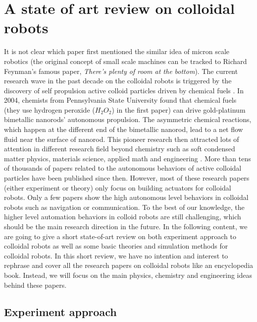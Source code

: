 \section{A state of art review on colloidal robots }
It is not clear which paper first mentioned the similar idea of micron scale robotics (the original concept of  small scale machines can be tracked to Richard Feynman's famous paper, \textit{There's plenty of room at the bottom}\autocite{feynman1960there}). The current research wave in the past decade on the colloidal robots is triggered by the discovery of self propulsion active colloid particles driven by chemical fuels \autocite{paxton2004catalytic}. In 2004, chemists from Pennsylvania State University found that chemical fuels (they use hydrogen peroxide ($H_2O_2$) in the first paper) can drive  gold-platinum bimetallic nanorods' autonomous propulsion. The asymmetric chemical reactions, which happen at the different end of the bimetallic nanorod,  lead to a net flow fluid near the surface of nanorod. This pioneer research then attracted lots of attention in different research field beyond chemistry such as soft condensed matter physics\autocite{Marchetti2013}, materials science\autocite{han2018engineering}, applied math\autocite{fodor2016far} and engineering \autocite{sitti2015biomedical}. More than tens of thousands of papers related to the autonomous behaviors of active colloidal particles have been published since then. However, most of these research papers (either experiment or theory) only focus on building actuators for colloidal robots. Only a few papers show the high autonomous level behaviors in colloidal robots such as navigation or communication. To the best of our knowledge, the higher level automation behaviors in colloid robots are still challenging, which should be the main research direction in the future. In the following content, we are going to give a short state-of-art review on both experiment approach to colloidal robots as well as some basic theories and simulation methods for colloidal robots. In this short review, we have no intention and interest to rephrase and cover all the research papers on colloidal robots like an encyclopedia book. Instead,  we will focus on the main physics, chemistry and engineering ideas behind these papers. 

\subsection{Experiment approach}


